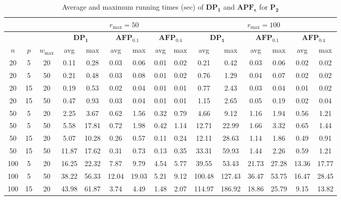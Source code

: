 \documentclass[12pt]{article}
\begin{document}
\begin{sloppypar}
\begin{table}[H]
\footnotesize  
\setlength{\tabcolsep}{2 pt} %
\caption{Average and maximum running times (sec) of $\mathbf{DP_1}$ and $\mathbf{APF_{\epsilon}}$ for $\mathbf{P_2}$}  \label{TA-D2}
\vspace{-10pt} 
\begin{center}
\begin{tabular}{|ccc|cc|cc|cc|cc|cc|cc|}  \hline	
\multicolumn{3}{|c|}{} & \multicolumn{6}{c|}{$r_{\max}=50$} & \multicolumn{6}{c|}{$r_{\max}=100$}\\ \hline
\multicolumn{3}{|c|}{} & \multicolumn{2}{c|}{$\mathbf{DP_1}$} & \multicolumn{2}{c|}{$\mathbf{AFP_{0.1}}$} & \multicolumn{2}{c|}{$\mathbf{AFP_{0.4}}$} & \multicolumn{2}{c|}{$\mathbf{DP_1}$} & \multicolumn{2}{c|}{$\mathbf{AFP_{0.1}}$} & \multicolumn{2}{c|}{$\mathbf{AFP_{0.4}}$} \\ \hline 
$n$ & $p$ & $w_{\max}$& avg & max & avg & max & avg & max &avg & max & avg & max & avg & max \\ \hline
20 & 5 & 20 & 0.11 & 0.28 & 0.03 & 0.06 & 0.01 & 0.02 & 0.21 & 0.42 & 0.03 & 0.06 & 0.02 & 0.02 \\ \hline
20 & 5 & 50 & 0.21 & 0.48 & 0.03 & 0.08	& 0.01 & 0.02 & 0.76 & 1.29	& 0.04 & 0.07 &	0.02 & 0.02 \\ \hline
20 & 15 & 20 & 0.19 & 0.53 & 0.02 & 0.04 & 0.01 & 0.01 & 0.77 &	2.43 & 0.03	& 0.04 & 0.01 &	0.02 \\ \hline
20 & 15 & 50 & 0.47 & 0.93 & 0.03 & 0.04 & 0.01 & 0.01 & 1.15 &	2.65 & 0.05 & 0.19 & 0.02 &	0.04 \\ \hline
50 & 5 & 20 & 2.25 & 3.67 &	0.62 & 1.56 & 0.32 & 0.79 & 4.66 & 9.12 & 1.16 & 1.94 &	0.56 & 1.21 \\ \hline
50 & 5 & 50 & 5.58 & 17.81 & 0.72 &	1.98 & 0.42 & 1.14 & 12.71 & 22.99 &	1.66 & 3.32 & 0.65 & 1.44 \\ \hline
50 & 15 & 20 & 5.07 & 10.28	& 0.26 & 0.57 &	0.11 & 0.24 & 12.11	& 28.63	& 1.14 & 1.86 &	0.49 & 0.91 \\ \hline
50 & 15 & 50 & 11.87 & 17.62 & 0.31 & 0.73 & 0.13 &	0.35 & 33.31 & 59.93 & 1.44	& 2.26 & 0.59 &	1.21 \\ \hline 
100 & 5 & 20 & 16.25 & 22.32 & 7.87	& 9.79 & 4.54 &	5.77 & 39.55 & 53.43 & 21.73 & 27.28 & 13.36 & 17.77 \\ \hline
100 & 5 & 50 & 38.22 & 56.33 & 12.04 & 19.03 & 5.21	& 9.12 & 100.48	& 127.43 & 36.47 & 53.75 & 16.47 & 28.45 \\ \hline
100 & 15 & 20 & 43.98 &	61.87 &	3.74 & 4.49	& 1.48 & 2.07 & 114.97 & 186.92 & 18.86 & 25.79 & 9.15 & 13.82 \\ \hline

\end{tabular}
\end{center}
\end{table}
\end{sloppypar}
\end{document}
